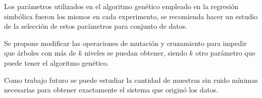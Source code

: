 \begin{recomendations}

    Los parámetros utilizados en el algoritmo genético empleado en la regresión simbólica fueron los mismos en cada experimento, se recomienda hacer un estudio de la selección de estos parámetros para conjunto de datos.

    Se propone modificar las operaciones de mutación y cruzamiento para impedir que árboles con más de $k$ niveles se puedan obtener, siendo $k$ otro parámetro que puede tener el algoritmo genético.

    Como trabajo futuro se puede estudiar la cantidad de muestras sin ruido mínimas necesarias para obtener exactamente el sistema que originó los datos.

\end{recomendations}
